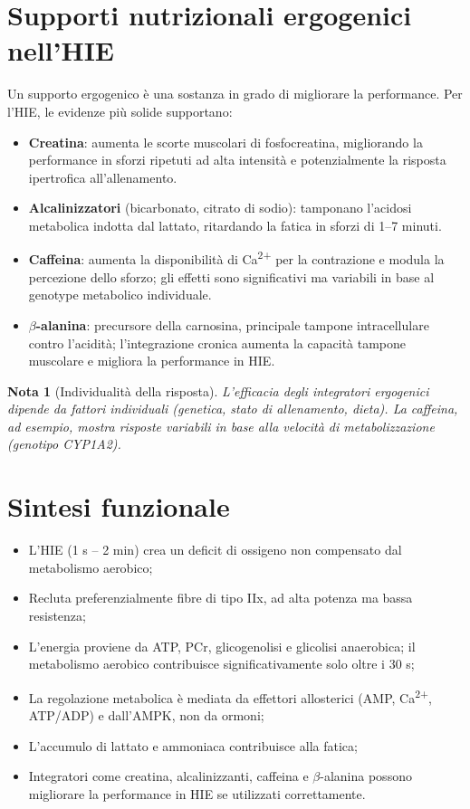 \documentclass[12pt,a4paper]{report}
\newtheorem{nota}{Nota}[section]
\begin{document}
\section{Supporti nutrizionali ergogenici nell'HIE}
Un supporto ergogenico è una sostanza in grado di migliorare la performance. Per l'HIE, le evidenze più solide supportano:
\begin{itemize}
\item \textbf{Creatina}: aumenta le scorte muscolari di fosfocreatina, migliorando la performance in sforzi ripetuti ad alta intensità e potenzialmente la risposta ipertrofica all'allenamento.
\item \textbf{Alcalinizzatori} (bicarbonato, citrato di sodio): tamponano l'acidosi metabolica indotta dal lattato, ritardando la fatica in sforzi di 1--7 minuti.
\item \textbf{Caffeina}: aumenta la disponibilità di Ca\textsuperscript{2+} per la contrazione e modula la percezione dello sforzo; gli effetti sono significativi ma variabili in base al genotype metabolico individuale.
\item \textbf{\(\beta\)-alanina}: precursore della carnosina, principale tampone intracellulare contro l'acidità; l'integrazione cronica aumenta la capacità tampone muscolare e migliora la performance in HIE.
\end{itemize}
\begin{nota}[Individualità della risposta]
L'efficacia degli integratori ergogenici dipende da fattori individuali (genetica, stato di allenamento, dieta). La caffeina, ad esempio, mostra risposte variabili in base alla velocità di metabolizzazione (genotipo CYP1A2).
\end{nota}

\section{Sintesi funzionale}
\begin{itemize}
\item L'HIE (1 s -- 2 min) crea un deficit di ossigeno non compensato dal metabolismo aerobico;
\item Recluta preferenzialmente fibre di tipo IIx, ad alta potenza ma bassa resistenza;
\item L'energia proviene da ATP, PCr, glicogenolisi e glicolisi anaerobica; il metabolismo aerobico contribuisce significativamente solo oltre i 30 s;
\item La regolazione metabolica è mediata da effettori allosterici (AMP, Ca\textsuperscript{2+}, ATP/ADP) e dall'AMPK, non da ormoni;
\item L'accumulo di lattato e ammoniaca contribuisce alla fatica;
\item Integratori come creatina, alcalinizzanti, caffeina e \(\beta\)-alanina possono migliorare la performance in HIE se utilizzati correttamente.
\end{itemize}
\end{document}
